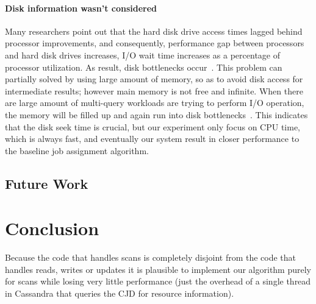 \paragraph{Disk information wasn’t considered}
    	Many researchers point out that the hard disk drive access times lagged behind processor improvements, and consequently, performance gap between processors and hard disk drives increases, I/O wait time increases as a percentage of processor utilization. As result, disk bottlenecks occur~\cite{IBM-IO, TMS-SSD}. This problem can partially solved by using large amount of memory, so as to avoid disk access for intermediate results; however main memory is not free and infinite. When there are large amount of multi-query workloads are trying to perform I/O operation, the memory will be filled up and again run into disk bottlenecks~\cite{Bouganim:1998:MSL:288627.288646}. This indicates that the disk seek time is crucial, but our experiment only focus on CPU time, which is always fast, and eventually our system result in closer performance to the baseline job assignment algorithm.

\subsection{Future Work}

\section{Conclusion}
\label{sec:conclusion}

Because the code that handles scans is completely disjoint from the code that handles reads, writes or updates it is plausible to implement our algorithm purely for scans while losing very little performance (just the overhead of a single thread in Cassandra that queries the CJD for resource information).
